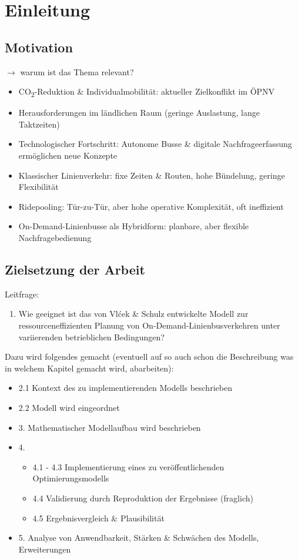 \chapter{Einleitung}
\section{Motivation} 
\label{sec:1.1}
$\rightarrow$ warum ist das Thema relevant?


\begin{itemize}
    \item CO\textsubscript{2}-Reduktion \& Individualmobilität: aktueller Zielkonflikt im ÖPNV
    \item Herausforderungen im ländlichen Raum (geringe Auslastung, lange Taktzeiten)
    \item Technologischer Fortschritt: Autonome Busse \& digitale Nachfrageerfassung ermöglichen neue Konzepte
    \item Klassischer Linienverkehr: fixe Zeiten \& Routen, hohe Bündelung, geringe Flexibilität
    \item Ridepooling: Tür-zu-Tür, aber hohe operative Komplexität, oft ineffizient
    \item On-Demand-Linienbusse als Hybridform: planbare, aber flexible Nachfragebedienung
\end{itemize}
\section{Zielsetzung der Arbeit}
\label{sec:1.2}
Leitfrage:
\begin{enumerate}
    \item Wie geeignet ist das von Vlćek \& Schulz entwickelte Modell zur ressourceneffizienten Planung von On-Demand-Linienbusverkehren unter variierenden betrieblichen Bedingungen?
\end{enumerate}
\vspace{1em}
Dazu wird folgendes gemacht (eventuell auf so auch schon die Beschreibung was in welchem Kapitel gemacht wird, abarbeiten):
\begin{itemize}
    \item 2.1 Kontext des zu implementierenden Modells beschrieben
    \item 2.2 Modell wird eingeordnet
    \item 3. Mathematischer Modellaufbau wird beschrieben
    \item 4. 
    \begin{itemize}
        \item 4.1 - 4.3 Implementierung eines zu veröffentlichenden Optimierungsmodells
        \item 4.4 Validierung durch Reproduktion der Ergebnisse (fraglich)
        \item 4.5 Ergebnisvergleich \& Plausibilität
    \end{itemize} 
    \item 5. Analyse von Anwendbarkeit, Stärken \& Schwächen des Modells, Erweiterungen
\end{itemize}
